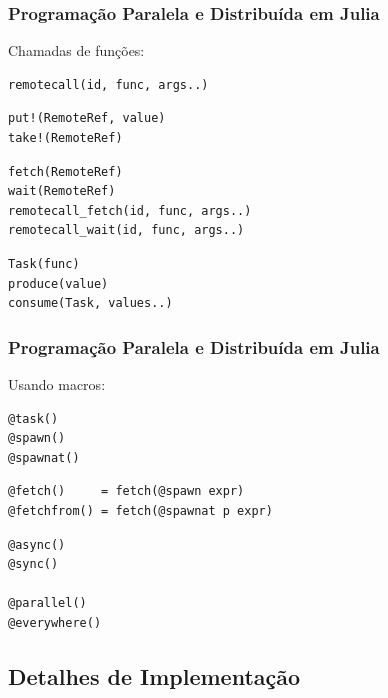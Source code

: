 \documentclass[10pt, compress]{beamer}
\begin{document}
\begin{frame}[fragile]
    \frametitle{Programação Paralela e Distribuída em Julia}
    Chamadas de funções:

    \begin{lstlisting}
remotecall(id, func, args..)
    \end{lstlisting}
    \pause
    \begin{lstlisting}
put!(RemoteRef, value)
take!(RemoteRef)
    \end{lstlisting}
    \pause
    \begin{lstlisting}
fetch(RemoteRef)
wait(RemoteRef)
remotecall_fetch(id, func, args..)
remotecall_wait(id, func, args..)
    \end{lstlisting}
    \pause
    \begin{lstlisting}
Task(func)
produce(value)
consume(Task, values..)
    \end{lstlisting}
    \let\thefootnote\relax{}
    \let\thefootnote\relax{}
\end{frame}

\begin{frame}[fragile]
    \frametitle{Programação Paralela e Distribuída em Julia}
    Usando macros:
    \begin{lstlisting}
@task()
@spawn()
@spawnat()
    \end{lstlisting}
    \pause
    \begin{lstlisting}
@fetch()     = fetch(@spawn expr)
@fetchfrom() = fetch(@spawnat p expr)
    \end{lstlisting}
    \pause
    \begin{lstlisting}
@async()
@sync()

@parallel()
@everywhere()
    \end{lstlisting}
    \let\thefootnote\relax{}
    \let\thefootnote\relax{}
\end{frame}

\subsection{Detalhes de Implementação}
\end{document}
